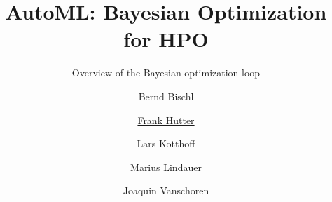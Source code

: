 %  


%

\usepackage[export]{adjustbox}
\usepackage{pgfpages}

\title[AutoML: Bayesian Optimization for HPO]{AutoML: Bayesian Optimization for HPO} %
\subtitle{Overview of the Bayesian optimization loop} %
\author[Marius Lindauer]{Bernd Bischl \and \underline{Frank Hutter} \and Lars Kotthoff\newline \and Marius Lindauer \and Joaquin Vanschoren}
\institute{}
\date{}




	
	\maketitle
	
    
    
    
    
    
    


